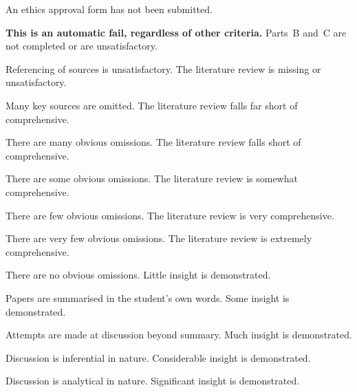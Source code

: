 \begin{markingrubric}
		\grade\fail An ethics approval form has not been submitted.
			\par \textbf{This is an automatic fail, regardless of other criteria.}
		\grade\fail Parts~B and~C are not completed or are unsatisfactory.
			\par Referencing of sources is unsatisfactory.
        \grade \fail The literature review is missing or unsatisfactory.
        	\par Many key sources are omitted.
        \grade The literature review falls far short of comprehensive.
        	\par There are many obvious omissions.
        \grade The literature review falls short of comprehensive.
        	\par There are some obvious omissions.
        \grade The literature review is somewhat comprehensive.
        	\par There are few obvious omissions.
        \grade The literature review is very comprehensive.
        	\par There are very few obvious omissions.
        \grade The literature review is extremely comprehensive.
        	\par There are no obvious omissions.
        \grade\fail Little insight is demonstrated.
        \par		Papers are summarised in the student's own words.
        \grade		Some insight is demonstrated.
        \par		Attempts are made at discussion beyond summary.
        \grade		Much insight is demonstrated.
        \par		Discussion is inferential in nature.
        \grade		Considerable insight is demonstrated.
        \par		Discussion is analytical in nature.
        \grade		Significant insight is demonstrated.

\end{markingrubric}
